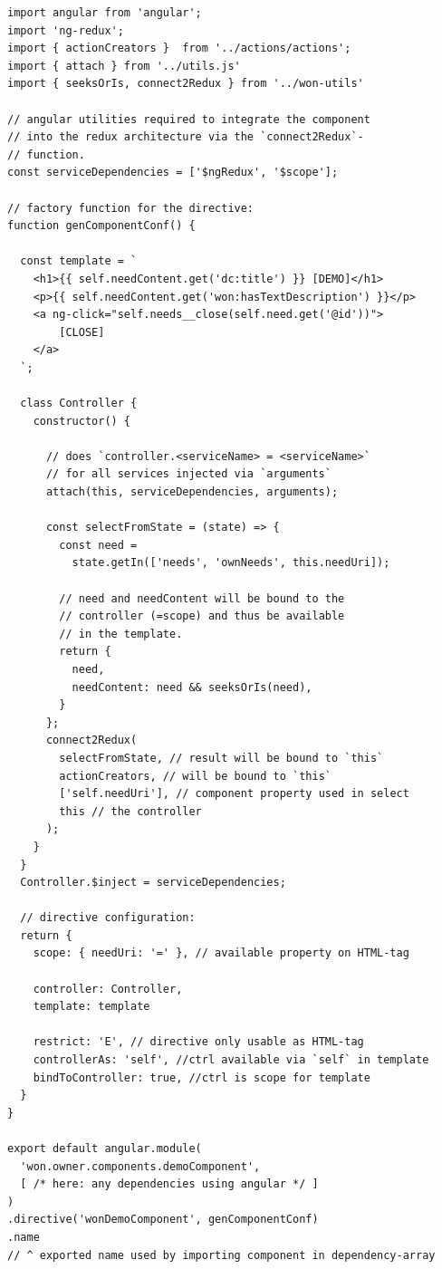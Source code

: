 \documentclass[a4paper,,tablecaptionabove]{scrbook}
\begin{document}
\begin{lstlisting}[caption={Example component.}, label=fig:example-component]
import angular from 'angular';
import 'ng-redux';
import { actionCreators }  from '../actions/actions';
import { attach } from '../utils.js'
import { seeksOrIs, connect2Redux } from '../won-utils'

// angular utilities required to integrate the component
// into the redux architecture via the `connect2Redux`-
// function.
const serviceDependencies = ['$ngRedux', '$scope'];

// factory function for the directive:
function genComponentConf() {

  const template = `
    <h1>{{ self.needContent.get('dc:title') }} [DEMO]</h1>
    <p>{{ self.needContent.get('won:hasTextDescription') }}</p>
    <a ng-click="self.needs__close(self.need.get('@id'))">
        [CLOSE]
    </a>
  `;

  class Controller {
    constructor() {

      // does `controller.<serviceName> = <serviceName>`
      // for all services injected via `arguments`
      attach(this, serviceDependencies, arguments);

      const selectFromState = (state) => {
        const need =
          state.getIn(['needs', 'ownNeeds', this.needUri]);

        // need and needContent will be bound to the
        // controller (=scope) and thus be available
        // in the template.
        return {
          need,
          needContent: need && seeksOrIs(need),
        }
      };
      connect2Redux(
        selectFromState, // result will be bound to `this`
        actionCreators, // will be bound to `this`
        ['self.needUri'], // component property used in select
        this // the controller
      );
    }
  }
  Controller.$inject = serviceDependencies;

  // directive configuration:
  return {
    scope: { needUri: '=' }, // available property on HTML-tag

    controller: Controller,
    template: template

    restrict: 'E', // directive only usable as HTML-tag
    controllerAs: 'self', //ctrl available via `self` in template
    bindToController: true, //ctrl is scope for template
  }
}

export default angular.module(
  'won.owner.components.demoComponent',
  [ /* here: any dependencies using angular */ ]
)
.directive('wonDemoComponent', genComponentConf)
.name
// ^ exported name used by importing component in dependency-array
\end{lstlisting}
\end{document}

